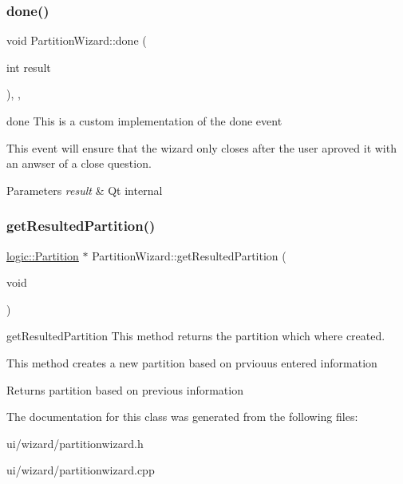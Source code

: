 \subsubsection{\texorpdfstring{done()}{done()}}
{\footnotesize\ttfamily void Partition\+Wizard\+::done (\begin{DoxyParamCaption}\item[{int}]{result }\end{DoxyParamCaption})\hspace{0.3cm}{\ttfamily [override]}, {\ttfamily [protected]}, {\ttfamily [virtual]}}



done This is a custom implementation of the done event 

This event will ensure that the wizard only closes after the user aproved it with an anwser of a close question. 
\begin{DoxyParams}{Parameters}
{\em result} & Qt internal \\
\hline
\end{DoxyParams}
\mbox{\label{class_partition_wizard_acb892f63fce0cff304f72df4771b4f05}} 
\subsubsection{\texorpdfstring{get\+Resulted\+Partition()}{getResultedPartition()}}
{\footnotesize\ttfamily \mbox{\hyperlink{classlogic_1_1_partition}{logic\+::\+Partition}} $\ast$ Partition\+Wizard\+::get\+Resulted\+Partition (\begin{DoxyParamCaption}\item[{void}]{ }\end{DoxyParamCaption})}



get\+Resulted\+Partition This method returns the partition which where created. 

This method creates a new partition based on prviouus entered information \begin{DoxyReturn}{Returns}
partition based on previous information 
\end{DoxyReturn}


The documentation for this class was generated from the following files\+:\begin{DoxyCompactItemize}
\item 
ui/wizard/partitionwizard.\+h\item 
ui/wizard/partitionwizard.\+cpp\end{DoxyCompactItemize}
